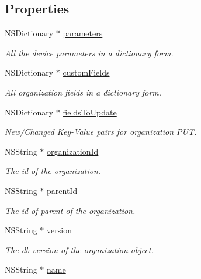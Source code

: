 \subsection*{Properties}
\begin{DoxyCompactItemize}
\item 
N\+S\+Dictionary $\ast$ \hyperlink{class_x_i_organization_info_a175bee8a4633042ef477361ad31908dc}{parameters}
\begin{DoxyCompactList}\small\item\em All the device parameters in a dictionary form. \end{DoxyCompactList}\item 
N\+S\+Dictionary $\ast$ \hyperlink{class_x_i_organization_info_acf05d4b2cc2f88ac2ad97deb7bbd5694}{custom\+Fields}
\begin{DoxyCompactList}\small\item\em All organization fields in a dictionary form. \end{DoxyCompactList}\item 
N\+S\+Dictionary $\ast$ \hyperlink{class_x_i_organization_info_a75ed2243f8baedafe76240d208eea53d}{fields\+To\+Update}
\begin{DoxyCompactList}\small\item\em New/\+Changed Key-\/\+Value pairs for organization P\+UT. \end{DoxyCompactList}\item 
N\+S\+String $\ast$ \hyperlink{class_x_i_organization_info_a9d9bb0499f373b9ee0233a68f2fa7e12}{organization\+Id}
\begin{DoxyCompactList}\small\item\em The id of the organization. \end{DoxyCompactList}\item 
N\+S\+String $\ast$ \hyperlink{class_x_i_organization_info_a28cc6a8c6ea642fe17a4773d019282c8}{parent\+Id}
\begin{DoxyCompactList}\small\item\em The id of parent of the organization. \end{DoxyCompactList}\item 
N\+S\+String $\ast$ \hyperlink{class_x_i_organization_info_a0e447ed591b36d1b7ef026ae6c0ce7af}{version}
\begin{DoxyCompactList}\small\item\em The db version of the organization object. \end{DoxyCompactList}\item 
N\+S\+String $\ast$ \hyperlink{class_x_i_organization_info_aead700b0aa4d8e2f3d6cc905300c8310}{name}

\end{DoxyCompactItemize}
